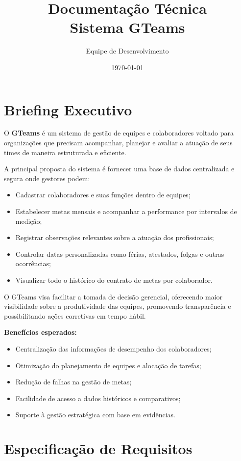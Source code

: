 \documentclass[12pt]{article}
\title{Documentação Técnica \\ \large Sistema GTeams}
\author{Equipe de Desenvolvimento}
\date{\today}
\begin{document}
\maketitle

\section{Briefing Executivo}

O \textbf{GTeams} é um sistema de gestão de equipes e colaboradores voltado para organizações que precisam acompanhar, planejar e avaliar a atuação de seus times de maneira estruturada e eficiente.

A principal proposta do sistema é fornecer uma base de dados centralizada e segura onde gestores podem:

\begin{itemize}
    \item Cadastrar colaboradores e suas funções dentro de equipes;
    \item Estabelecer metas mensais e acompanhar a performance por intervalos de medição;
    \item Registrar observações relevantes sobre a atuação dos profissionais;
    \item Controlar datas personalizadas como férias, atestados, folgas e outras ocorrências;
    \item Visualizar todo o histórico do contrato de metas por colaborador.
\end{itemize}

O GTeams visa facilitar a tomada de decisão gerencial, oferecendo maior visibilidade sobre a produtividade das equipes, promovendo transparência e possibilitando ações corretivas em tempo hábil.

\textbf{Benefícios esperados:}
\begin{itemize}
    \item Centralização das informações de desempenho dos colaboradores;
    \item Otimização do planejamento de equipes e alocação de tarefas;
    \item Redução de falhas na gestão de metas;
    \item Facilidade de acesso a dados históricos e comparativos;
    \item Suporte à gestão estratégica com base em evidências.
\end{itemize}

\section{Especificação de Requisitos}
\end{document}
